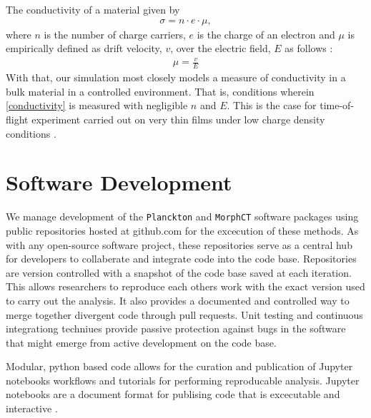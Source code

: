 The conductivity of a material given by 
\begin{align}
    \label{conductivity}
    \sigma = n \cdot e \cdot \mu,
\end{align}
where $n$ is the number of charge carriers, $e$ is the charge of an electron and $\mu$ is empirically
defined as drift velocity, $v$, over the electric field, $E$ as follows \cite{Kokil2012}:
\begin{align}
    \label{m}
    \mu = \frac{v}{E}
\end{align}
With that, our  simulation most closely models a measure of conductivity in a bulk material in a controlled
environment. That is, conditions wherein \autoref{conductivity} is measured with negligible $n$ and $E$.
This is the case for time-of-flight experiment carried out on very thin films under low charge density
conditions \cite{Chen2000a}.

\section{Software Development}

\label{software-methods}

We manage development of the \texttt{Planckton} and \texttt{MorphCT} software packages using public repositories hosted at
github.com\cite{cmelab} for the excecution of these methods.
As with any open-source software project, these repositories serve as a
central hub for developers to collaberate and integrate code into the code base. Repositories are
version controlled with a snapshot of the code base saved at each iteration. This allows researchers to 
reproduce each others work with the exact version used to carry out the analysis. It also provides a
documented and controlled way to merge together divergent code through pull requests. Unit testing and
continuous integrationg techniues provide passive protection against bugs in the software that might emerge
from active development on the code base. 

Modular, python based code allows for the curation and publication of Jupyter notebooks workflows and
tutorials for performing reproducable analysis. Jupyter notebooks are a document format for publising code
that is excecutable and interactive \cite{Kluyver2016}. 

